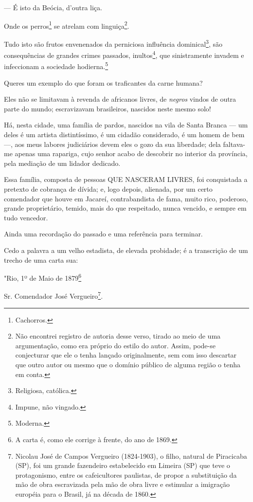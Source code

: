--- É isto da Beócia, d'outra liça.

Onde os perros\footnote{Cachorros.} se atrelam com linguiça\footnote{
  Não encontrei registro de autoria desse verso, tirado ao meio de uma
  argumentação, como era próprio do estilo do autor. Assim, pode-se
  conjecturar que ele o tenha lançado originalmente, sem com isso
  descartar que outro autor ou mesmo que o domínio público de alguma
  região o tenha em conta.}.

Tudo isto são frutos envenenados da perniciosa influência
dominical\footnote{Religiosa, católica.}, são consequências de grandes
crimes passados, inultos\footnote{Impune, não vingado.}, que
sinistramente invadem e infeccionam a sociedade hodierna.\footnote{
  Moderna.}

Queres um exemplo do que foram os traficantes da carne humana?

Eles não se limitavam à revenda de africanos livres, de \emph{negros}
vindos de outra parte do mundo; escravizavam brasileiros, nascidos neste
mesmo solo!

Há, nesta cidade, uma família de pardos, nascidos na vila de Santa
Branca --- um deles é um artista distintíssimo, é um cidadão
considerado, é um homem de bem ---, aos meus labores judiciários devem
eles o gozo da sua liberdade; dela faltava-me apenas uma rapariga, cujo
senhor acabo de descobrir no interior da província, pela mediação de um
lidador dedicado.

Essa família, composta de pessoas QUE NASCERAM LIVRES, foi conquistada a
pretexto de cobrança de dívida; e, logo depois, alienada, por um certo
comendador que houve em Jacareí, contrabandista de fama, muito rico,
poderoso, grande proprietário, temido, mais do que respeitado, nunca
vencido, e sempre em tudo vencedor.

Ainda uma recordação do passado e uma referência para terminar.

Cedo a palavra a um velho estadista, de elevada probidade; é a
transcrição de um trecho de uma carta sua:

"Rio, 1º de Maio de 1879\footnote{A carta é, como ele corrige à
  frente, do ano de 1869.}

Sr. Comendador José Vergueiro\footnote{Nicolau José de Campos
  Vergueiro (1824-1903), o filho, natural de Piracicaba (SP), foi um
  grande fazendeiro estabelecido em Limeira (SP) que teve o
  protagonismo, entre os cafeicultores paulistas, de propor a
  substituição da mão de obra escravizada pela mão de obra livre e
  estimular a imigração européia para o Brasil, já na década de 1860.}.


